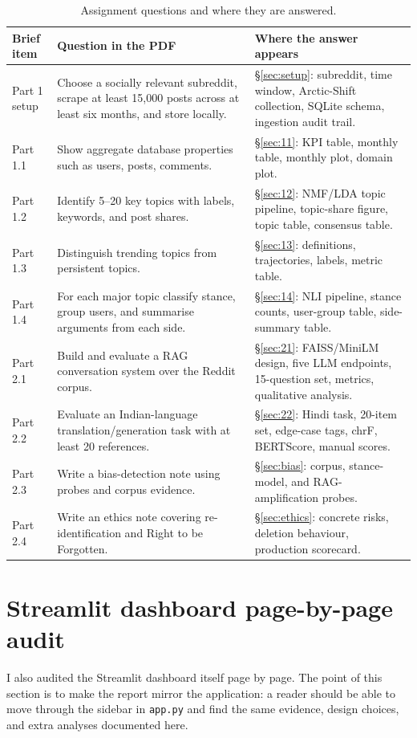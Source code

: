 \documentclass[11pt,a4paper]{article}
\begin{document}
\begin{table}[H]
\centering
\small
\caption{Assignment questions and where they are answered.}
\label{tab:roadmap}
\renewcommand{\arraystretch}{1.18}
\begin{tabularx}{\linewidth}{p{2.4cm} X X}
\toprule
\textbf{Brief item} & \textbf{Question in the PDF} & \textbf{Where the answer appears} \\
\midrule
Part 1 setup & Choose a socially relevant subreddit, scrape at least 15{,}000 posts across at least six months, and store locally. & \S\ref{sec:setup}: subreddit, time window, Arctic-Shift collection, SQLite schema, ingestion audit trail. \\
Part 1.1 & Show aggregate database properties such as users, posts, comments. & \S\ref{sec:11}: KPI table, monthly table, monthly plot, domain plot. \\
Part 1.2 & Identify 5--20 key topics with labels, keywords, and post shares. & \S\ref{sec:12}: NMF/LDA topic pipeline, topic-share figure, topic table, consensus table. \\
Part 1.3 & Distinguish trending topics from persistent topics. & \S\ref{sec:13}: definitions, trajectories, labels, metric table. \\
Part 1.4 & For each major topic classify stance, group users, and summarise arguments from each side. & \S\ref{sec:14}: NLI pipeline, stance counts, user-group table, side-summary table. \\
Part 2.1 & Build and evaluate a RAG conversation system over the Reddit corpus. & \S\ref{sec:21}: FAISS/MiniLM design, five LLM endpoints, 15-question set, metrics, qualitative analysis. \\
Part 2.2 & Evaluate an Indian-language translation/generation task with at least 20 references. & \S\ref{sec:22}: Hindi task, 20-item set, edge-case tags, chrF, BERTScore, manual scores. \\
Part 2.3 & Write a bias-detection note using probes and corpus evidence. & \S\ref{sec:bias}: corpus, stance-model, and RAG-amplification probes. \\
Part 2.4 & Write an ethics note covering re-identification and Right to be Forgotten. & \S\ref{sec:ethics}: concrete risks, deletion behaviour, production scorecard. \\
\bottomrule
\end{tabularx}
\end{table}

\section*{Streamlit dashboard page-by-page audit}
I also audited the Streamlit dashboard itself page by page. The point of this section is to make
the report mirror the application: a reader should be able to move through the sidebar in
\texttt{app.py} and find the same evidence, design choices, and extra analyses documented here.
\end{document}
